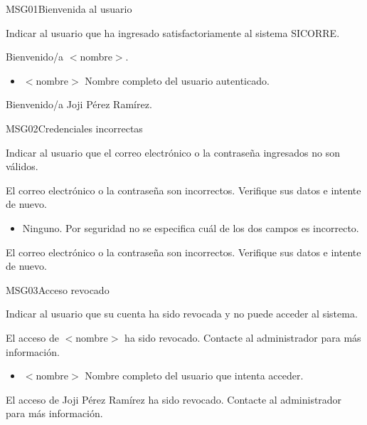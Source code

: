
\begin{cdtMessage}[msgInfoColor]{MSG01}{Bienvenida al usuario}
	\item[Propósito:] Indicar al usuario que ha ingresado 
	satisfactoriamente al sistema SICORRE.
	\item[Redacción:] Bienvenido/a $<$nombre$>$.
	\item[Parámetros:] \hspace{1cm}
	\begin{itemize}
		\item $<$nombre$>$ Nombre completo del usuario autenticado.
	\end{itemize}
	\item[Ejemplos:] Bienvenido/a Joji Pérez Ramírez.
\end{cdtMessage}

\begin{cdtMessage}[msgErrorColor]{MSG02}{Credenciales incorrectas}
	\item[Propósito:] Indicar al usuario que el correo electrónico 
	o la contraseña ingresados no son válidos.
	\item[Redacción:] El correo electrónico o la contraseña 
	son incorrectos. Verifique sus datos e intente de nuevo.
	\item[Parámetros:] \hspace{1cm}
	\begin{itemize}
		\item Ninguno. Por seguridad no se especifica cuál de 
		los dos campos es incorrecto.
	\end{itemize}
	\item[Ejemplos:] El correo electrónico o la contraseña 
	son incorrectos. Verifique sus datos e intente de nuevo.
\end{cdtMessage}

\begin{cdtMessage}[msgErrorColor]{MSG03}{Acceso revocado}
	\item[Propósito:] Indicar al usuario que su cuenta ha sido 
	revocada y no puede acceder al sistema.
	\item[Redacción:] El acceso de $<$nombre$>$ ha sido revocado. 
	Contacte al administrador para más información.
	\item[Parámetros:] \hspace{1cm}
	\begin{itemize}
		\item $<$nombre$>$ Nombre completo del usuario 
		que intenta acceder.
	\end{itemize}
	\item[Ejemplos:] El acceso de Joji Pérez Ramírez ha sido 
	revocado. Contacte al administrador para más información.
\end{cdtMessage}

